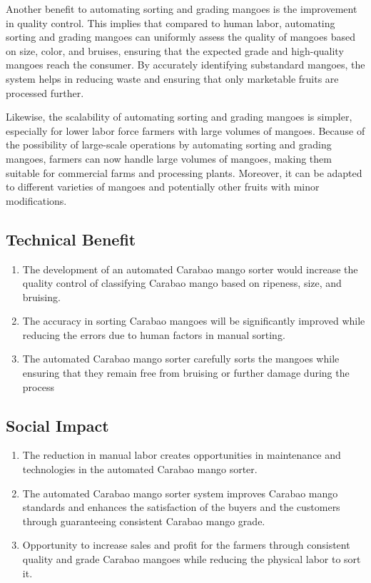 Another benefit to automating sorting and grading mangoes is the improvement in
quality control.  This implies that compared to human labor, automating sorting
and grading mangoes can uniformly assess the quality of mangoes based on size,
color, and \gls{bruises}, ensuring that the expected grade and high-quality
mangoes reach the consumer. By accurately identifying substandard mangoes, the
system helps in reducing waste and ensuring that only marketable fruits are
processed further.

Likewise, the scalability of automating sorting and grading mangoes is simpler,
especially for lower labor force farmers with large volumes of mangoes. Because
of the possibility of large-scale operations by automating sorting and grading
mangoes, farmers can now handle large volumes of mangoes, making them suitable
for commercial farms and processing plants. Moreover, it can be adapted to
different varieties of mangoes and potentially other fruits with minor
modifications.


\subsection{Technical Benefit}

\begin{enumerate}
	\item The development of an automated \gls{Carabao mango} sorter would increase the quality control 
	of classifying \gls{Carabao mango} based on ripeness, size, and bruising.
	
	\item The accuracy in sorting Carabao mangoes will be significantly improved while
	reducing the errors due to human factors in manual sorting.
	
	\item The automated \gls{Carabao mango}  sorter carefully sorts the mangoes 
	while ensuring that they remain free from bruising or further damage during the process	
\end{enumerate}

\subsection{Social Impact}

\begin{enumerate}
	\item The reduction in manual labor creates opportunities in maintenance and
	technologies in the automated \gls{Carabao mango}  sorter.
	
	\item The automated \gls{Carabao mango}  sorter system improves Carabao mango 
	standards and enhances the satisfaction of the buyers and the customers through
	guaranteeing consistent Carabao mango grade.
	
	\item Opportunity to increase sales and profit for the farmers through consistent 
	quality and grade Carabao mangoes while reducing the physical labor to sort it.
\end{enumerate}

